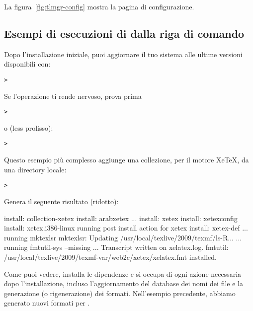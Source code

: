 \documentclass{article}
\begin{document}
La figura~\ref{fig:tlmgr-config} mostra la pagina di configurazione.

\subsection{Esempi di esecuzioni di  dalla riga di comando}

Dopo l'installazione iniziale, puoi aggiornare il tuo sistema alle ultime
versioni disponibili con:
\begin{alltt}
> 
\end{alltt}
Se l'operazione ti rende nervoso, prova prima
\begin{alltt}
> 
\end{alltt}
o (less prolisso):
\begin{alltt}
> 
\end{alltt}

Questo esempio più complesso aggiunge una collezione, per il motore
Xe\TeX, da una directory locale:

\begin{alltt}
> 
\end{alltt}
Genera il seguente risultato (ridotto):
\begin{fverbatim}
install: collection-xetex
install: arabxetex
...
install: xetex
install: xetexconfig
install: xetex.i386-linux
running post install action for xetex
install: xetex-def
...
running mktexlsr
mktexlsr: Updating /usr/local/texlive/2009/texmf/ls-R...
...
running fmtutil-sys --missing
...
Transcript written on xelatex.log.
fmtutil: /usr/local/texlive/2009/texmf-var/web2c/xetex/xelatex.fmt installed.
\end{fverbatim}

Come puoi vedere,  installa le dipendenze e si occupa di ogni
azione necessaria dopo l'installazione, incluso l'aggiornamento del
database dei nomi dei file e la generazione (o rigenerazione) dei formati.
Nell'esempio precedente, abbiamo generato nuovi formati per \XeTeX.
\end{document}
